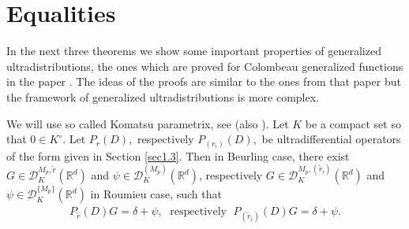 \documentclass[sn-mathphys,Numbered]{sn-jnl}%
\theoremstyle{thmstyleone}%
\theoremstyle{thmstyletwo}%
\theoremstyle{thmstylethree}%
\begin{document}
\section{Equalities}


In the next three theorems we show some  important properties of generalized ultradistributions, the ones which are proved for Colombeau generalized functions in the paper \cite{PSV}. The ideas of the proofs are similar to the ones from that paper but the framework of generalized ultradistributions  is more complex.



We will use so called Komatsu parametrix, see \cite[p. 195]{Komatsu2} (also \cite{ppv}). Let $K$ be a compact set so that $0\in K^\circ.$ Let $P_r(D),$ respectively $P_{(r_i)}(D),$ be ultradifferential operators of the form given in Section \ref{sec1.3}. Then in Beurling case, there exist $G\in \mathcal{D}^{M_p,\tilde r}_{K}(\mathbb{R}^d)$ and $\psi\in \mathcal{D}^{(M_p)}_K(\mathbb R^d)$, respectively $G\in \mathcal{D}^{M_p,(\tilde r_i)}_{K}(\mathbb{R}^d)$ and $\psi\in \mathcal{D}^{\{M_p\}}_K(\mathbb R^d)$ in Roumieu case, such that 
\begin{align*}
P_{\tilde r}(D)G=\delta+\psi,\;\text{ respectively }\;P_{(\tilde r_i)}(D)G=\delta+\psi.
\end{align*}
\end{document}
